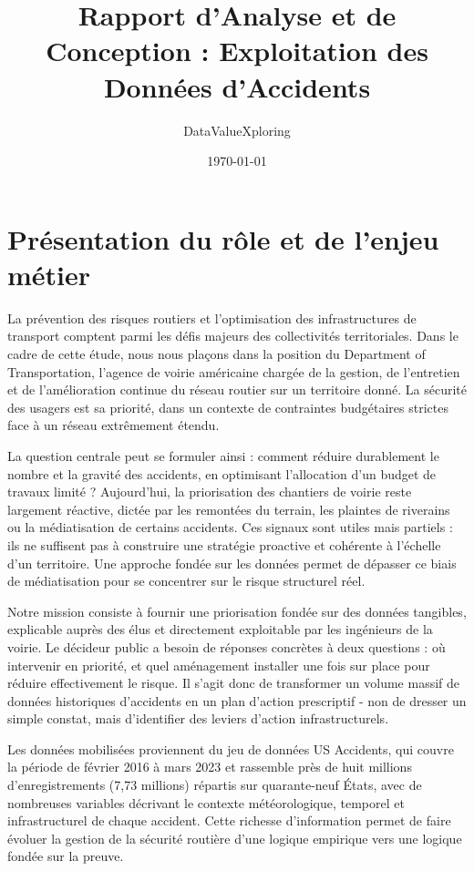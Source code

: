 \documentclass[12pt, a4paper]{article}
\title{Rapport d'Analyse et de Conception : Exploitation des Données d'Accidents}
\author{DataValueXploring}
\date{\today}
\begin{document}
\maketitle
\tableofcontents
\newpage

\section{Présentation du rôle et de l'enjeu métier}

La prévention des risques routiers et l'optimisation des infrastructures de transport comptent parmi les défis majeurs des collectivités territoriales. Dans le cadre de cette étude, nous nous plaçons dans la position du Department of Transportation, l'agence de voirie américaine chargée de la gestion, de l'entretien et de l'amélioration continue du réseau routier sur un territoire donné. La sécurité des usagers est sa priorité, dans un contexte de contraintes budgétaires strictes face à un réseau extrêmement étendu.

La question centrale peut se formuler ainsi : comment réduire durablement le nombre et la gravité des accidents, en optimisant l'allocation d'un budget de travaux limité ? Aujourd'hui, la priorisation des chantiers de voirie reste largement réactive, dictée par les remontées du terrain, les plaintes de riverains ou la médiatisation de certains accidents. Ces signaux sont utiles mais partiels : ils ne suffisent pas à construire une stratégie proactive et cohérente à l'échelle d'un territoire. Une approche fondée sur les données permet de dépasser ce biais de médiatisation pour se concentrer sur le risque structurel réel.

Notre mission consiste à fournir une priorisation fondée sur des données tangibles, explicable auprès des élus et directement exploitable par les ingénieurs de la voirie. Le décideur public a besoin de réponses concrètes à deux questions : où intervenir en priorité, et quel aménagement installer une fois sur place pour réduire effectivement le risque. Il s'agit donc de transformer un volume massif de données historiques d'accidents en un plan d'action prescriptif - non de dresser un simple constat, mais d'identifier des leviers d'action infrastructurels.

Les données mobilisées proviennent du jeu de données US Accidents, qui couvre la période de février 2016 à mars 2023 et rassemble près de huit millions d'enregistrements (7,73 millions) répartis sur quarante-neuf États, avec de nombreuses variables décrivant le contexte météorologique, temporel et infrastructurel de chaque accident. Cette richesse d'information permet de faire évoluer la gestion de la sécurité routière d'une logique empirique vers une logique fondée sur la preuve.
\end{document}
